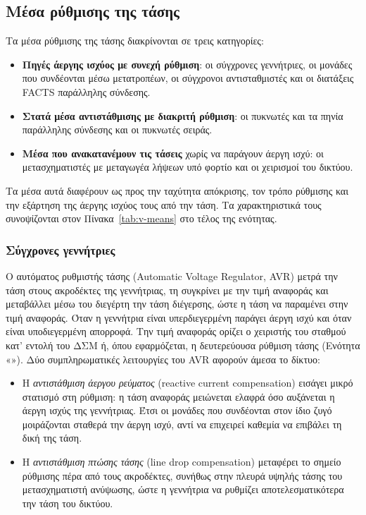 \subsection{Μέσα ρύθμισης της τάσης}
\label{sec:q-sources}

Τα μέσα ρύθμισης της τάσης διακρίνονται σε τρεις κατηγορίες:

\begin{itemize}
\item \textbf{Πηγές άεργης ισχύος με συνεχή ρύθμιση}: οι σύγχρονες γεννήτριες, οι μονάδες που
      συνδέονται μέσω μετατροπέων, οι σύγχρονοι αντισταθμιστές και οι διατάξεις FACTS
      παράλληλης σύνδεσης.
\item \textbf{Στατά μέσα αντιστάθμισης με διακριτή ρύθμιση}: οι πυκνωτές και τα πηνία
      παράλληλης σύνδεσης και οι πυκνωτές σειράς.
\item \textbf{Μέσα που ανακατανέμουν τις τάσεις} χωρίς να παράγουν άεργη ισχύ: οι
      μετασχηματιστές με μεταγωγέα λήψεων υπό φορτίο και οι χειρισμοί του δικτύου.
\end{itemize}

Τα μέσα αυτά διαφέρουν ως προς την ταχύτητα απόκρισης, τον τρόπο ρύθμισης και την εξάρτηση
της άεργης ισχύος τους από την τάση. Τα χαρακτηριστικά τους συνοψίζονται στον
Πίνακα~\ref{tab:v-means} στο τέλος της ενότητας.

\subsubsection{Σύγχρονες γεννήτριες}
\label{sec:sg}

Ο αυτόματος ρυθμιστής τάσης (Automatic Voltage Regulator, AVR) μετρά την τάση στους
ακροδέκτες της γεννήτριας, τη συγκρίνει με την τιμή αναφοράς και μεταβάλλει μέσω του διεγέρτη
την τάση διέγερσης, ώστε η τάση να παραμένει στην τιμή αναφοράς. Όταν η γεννήτρια είναι
υπερδιεγερμένη παράγει άεργη ισχύ και όταν είναι υποδιεγερμένη απορροφά. Την τιμή αναφοράς
ορίζει ο χειριστής του σταθμού κατ' εντολή του ΔΣΜ ή, όπου εφαρμόζεται, η δευτερεύουσα
ρύθμιση τάσης (Ενότητα «»). Δύο συμπληρωματικές λειτουργίες του AVR
αφορούν άμεσα το δίκτυο:

\begin{itemize}
\item Η \emph{αντιστάθμιση άεργου ρεύματος} (reactive current compensation) εισάγει μικρό
      στατισμό στη ρύθμιση: η τάση αναφοράς μειώνεται ελαφρά όσο αυξάνεται η άεργη ισχύς της
      γεννήτριας. Έτσι οι μονάδες που συνδέονται στον ίδιο ζυγό μοιράζονται σταθερά την άεργη
      ισχύ, αντί να επιχειρεί καθεμία να επιβάλει τη δική της τάση.
\item Η \emph{αντιστάθμιση πτώσης τάσης} (line drop compensation) μεταφέρει το σημείο
      ρύθμισης πέρα από τους ακροδέκτες, συνήθως στην πλευρά υψηλής τάσης του μετασχηματιστή
      ανύψωσης, ώστε η γεννήτρια να ρυθμίζει αποτελεσματικότερα την τάση του δικτύου.
\end{itemize}


